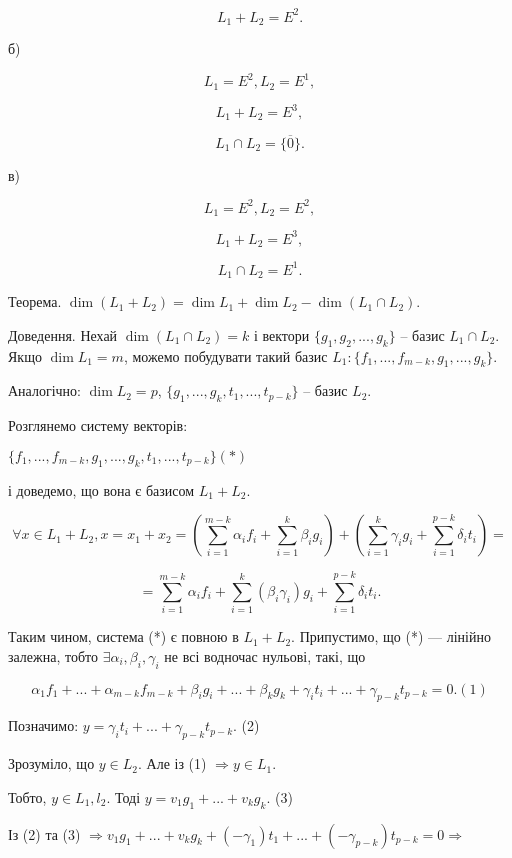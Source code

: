 $$L_1 + L_2 = E^2.$$


б)

$$L_1 = E^2, L_2 = E^1,$$

$$L_1 + L_2 = E^3,$$

$$L_1 \cap L_2 = \{\overline{0}\}.$$


в)

$$L_1 = E^2, L_2 = E^2,$$

$$L_1 + L_2 = E^3,$$

$$L_1 \cap L_2 = E^1.$$



Теорема. $\dim(L_1 + L_2) = \dim L_1 + \dim L_2 - \dim(L_1 \cap L_2)$.

Доведення. Нехай $\dim(L_1 \cap L_2) = k$ і вектори $\{g_1, g_2, ..., g_k\}$ -- базис
$L_1 \cap L_2$. Якщо $\dim L_1 = m$, можемо побудувати такий базис
$L_1: \{f_1, ..., f_{m-k}, g_1, ..., g_k\}$.


Аналогічно: $\dim L_2 = p$, $\{g_1, ..., g_k, t_1, ..., t_{p-k}\}$ -- базис $L_2$.

Розглянемо систему векторів:

$\{f_1, ..., f_{m-k}, g_1, ..., g_k, t_1, ..., t_{p-k}\} (*)$

і доведемо, що вона є базисом $L_1 + L_2$.

$$\forall x \in L_1 + L_2, x = x_1 + x_2
= \left( \sum\limits_{i=1}^{m-k} \alpha_i f_i
		+ \sum\limits_{i=1}^{k} \beta_i g_i \right)
+ \left( \sum\limits_{i=1}^{k} \gamma_i g_i
		+ \sum\limits_{i=1}^{p-k} \delta_i t_i \right) = $$
		
$$= \sum\limits_{i=1}^{m-k} \alpha_i f_i
+ \sum\limits_{i=1}^{k} (\beta_i \gamma_i)g_i
+ \sum\limits_{i=1}^{p-k} \delta_i t_i.$$


Таким чином, система (*) є повною в $L_1 + L_2$. Припустимо, що (*) ---
лінійно залежна, тобто $\exists \alpha_i, \beta_i, \gamma_i$ не всі водночас нульові, такі, що

$$\alpha_1 f_1 + ... + \alpha_{m-k} f_{m-k} + \beta_i g_i + ... + \beta_k g_k + \gamma_i t_i + ... + \gamma_{p-k} t_{p-k} = 0. (1)$$

Позначимо: $y = \gamma_i t_i + ... + \gamma_{p-k} t_{p-k}$. (2)

Зрозуміло, що $y \in L_2$. Але із (1) $\Rightarrow y \in L_1$.

Тобто, $y \in L_1, l_2$. Тоді $y = v_1 g_1 + ... + v_k g_k$. (3)

Із (2) та (3) $\Rightarrow v_1 g_1 + ... + v_k g_k + (-\gamma_1) t_1 + ... + (-\gamma_{p-k}) t_{p-k} = 0 \Rightarrow$

